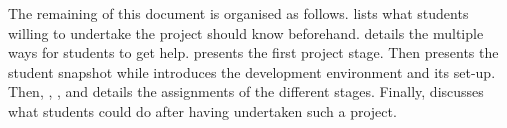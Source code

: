 The remaining of this document is organised as follows.  lists what students willing to undertake the
project should know beforehand. 
details the multiple ways for students to get help.  presents the first project stage. Then  presents the student snapshot while  introduces the development environment and its set-up.
Then, , ,  and  details the assignments of the different stages. Finally,
 discusses what students could do
after having undertaken such a project.
